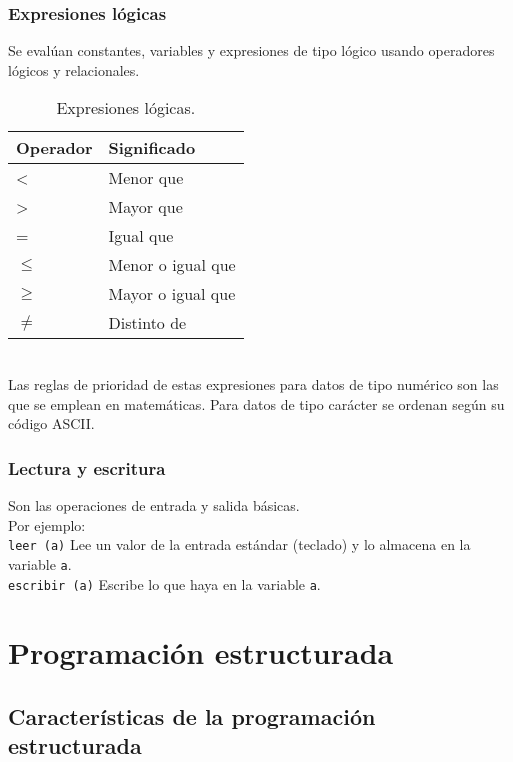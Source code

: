 \documentclass[12pt,letterpaper]{article}
\begin{document}
\subsubsection{Expresiones lógicas}

Se evalúan constantes, variables y expresiones de tipo lógico usando operadores lógicos y relacionales.
\begin{table}[htbp]
	\begin{center}
		\begin{tabular}{|l|l|}
			\hline
			Operador & Significado \\
			\hline \hline
			< & Menor que \\ \hline
			> & Mayor que \\ \hline
			= & Igual que \\ \hline
			$\leq$ & Menor o igual que \\ \hline
			$\geq$ & Mayor o igual que \\ \hline
			$\neq$ & Distinto de \\ \hline
		\end{tabular}
		\caption{Expresiones lógicas.}
		\label{tabla:Expresiones lógicas}
	\end{center}
\end{table}\\
Las reglas de prioridad de estas expresiones para datos de tipo numérico son las que se emplean en matemáticas. Para datos de tipo carácter se ordenan según su código ASCII.

\newpage

\subsubsection{Lectura y escritura}

Son las operaciones de entrada y salida básicas.\\
Por ejemplo:\\
\texttt{leer (a)} Lee un valor de la entrada estándar (teclado) y lo almacena en la variable \texttt{a}.\\
\texttt{escribir (a)} Escribe lo que haya en la variable \texttt{a}.

\section{Programación estructurada}
\subsection{Características de la programación estructurada}
\end{document}
